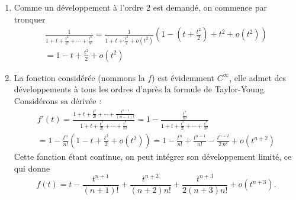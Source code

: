 \begin{enumerate}
 \item Comme un développement à l'ordre 2 est demandé, on commence par tronquer
\begin{multline*}
\frac{1}{1 + t + \frac{t^{2}}{2!} + \cdots + \frac{t^{n}}{n!}}
= \frac{1}{1 + t + \frac{t^{2}}{2} + o(t^2)}\left( 1 - (t+\frac{t^{2}}{2}) + t^{2} + o(t^{2})\right) \\
= 1 - t + \frac{t^{2}}{2} + o(t^{2})
\end{multline*}
 
 \item La fonction considérée (nommons la $f$) est évidemment $C^{\infty}$, elle admet des développements à tous les ordres d'après la formule de Taylor-Young. Considérons sa dérivée :
\begin{multline*}
f'(t) = \frac{1 + t + \frac{t^{2}}{2!} + \cdots + \frac{t^{n-1}}{(n-1)!}}{1+t+\frac{t^{2}}{2!} + \cdots +\frac{t^{n}}{n!}} 
= 1 - \frac{\frac{t^{n}}{n!}}{1 + t + \frac{t^{2}}{2!} + \cdots +\frac{t^{n}}{n!}}\\
= 1 - \frac{t^{n}}{n!}(1 - t + \frac{t^2}{2} + o(t^2))
= 1 - \frac{t^{n}}{n!} + \frac{t^{n+1}}{n!} -\frac{t^{n+2}}{2\,n!} + o(t^{n+2})
\end{multline*}
Cette fonction étant continue, on peut intégrer son développement limité, ce qui donne
\[
f(t) = t-\frac{t^{n+1}}{(n+1)!}+ \frac{t^{n+2}}{(n+2)n!}+\frac{t^{n+3}}{2(n+3)n!}+o(t^{n+3}).
\]

\end{enumerate}
